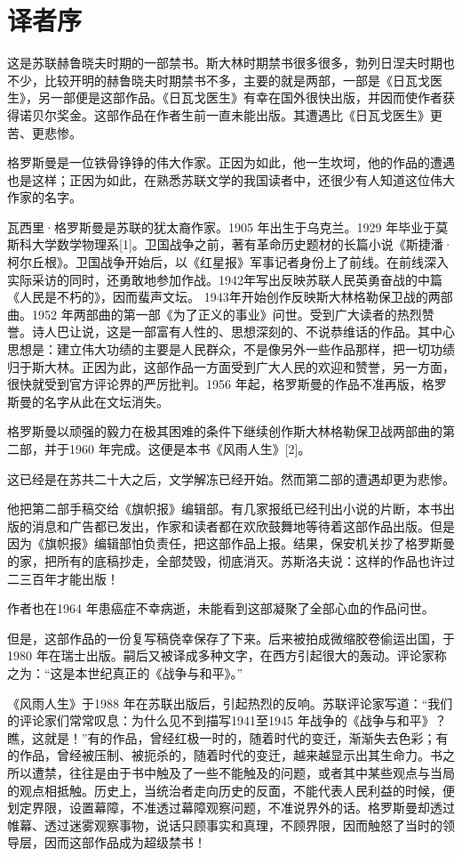 \section{ 译者序}


这是苏联赫鲁晓夫时期的一部禁书。斯大林时期禁书很多很多，勃列日涅夫时期也不少，比较开明的赫鲁晓夫时期禁书不多，主要的就是两部，一部是《日瓦戈医生》，另一部便是这部作品。《日瓦戈医生》有幸在国外很快出版，并因而使作者获得诺贝尔奖金。这部作品在作者生前一直未能出版。其遭遇比《日瓦戈医生》更苦、更悲惨。

格罗斯曼是一位铁骨铮铮的伟大作家。正因为如此，他一生坎坷，他的作品的遭遇也是这样；正因为如此，在熟悉苏联文学的我国读者中，还很少有人知道这位伟大作家的名字。

瓦西里·格罗斯曼是苏联的犹太裔作家。1905 年出生于乌克兰。1929 年毕业于莫斯科大学数学物理系[1]。卫国战争之前，著有革命历史题材的长篇小说《斯捷潘·柯尔丘根》。卫国战争开始后，以《红星报》军事记者身份上了前线。在前线深入实际采访的同时，还勇敢地参加作战。1942年写出反映苏联人民英勇奋战的中篇《人民是不朽的》，因而蜚声文坛。 1943年开始创作反映斯大林格勒保卫战的两部曲。1952 年两部曲的第一部《为了正义的事业》问世。受到广大读者的热烈赞誉。诗人巴让说，这是一部富有人性的、思想深刻的、不说恭维话的作品。其中心思想是：建立伟大功绩的主要是人民群众，不是像另外一些作品那样，把一切功绩归于斯大林。正因为此，这部作品一方面受到广大人民的欢迎和赞誉，另一方面，很快就受到官方评论界的严厉批判。1956 年起，格罗斯曼的作品不准再版，格罗斯曼的名字从此在文坛消失。

格罗斯曼以顽强的毅力在极其困难的条件下继续创作斯大林格勒保卫战两部曲的第二部，并于1960 年完成。这便是本书《风雨人生》[2]。

这已经是在苏共二十大之后，文学解冻已经开始。然而第二部的遭遇却更为悲惨。

他把第二部手稿交给《旗帜报》编辑部。有几家报纸已经刊出小说的片断，本书出版的消息和广告都已发出，作家和读者都在欢欣鼓舞地等待着这部作品出版。但是因为《旗帜报》编辑部怕负责任，把这部作品上报。结果，保安机关抄了格罗斯曼的家，把所有的底稿抄走，全部焚毁，彻底消灭。苏斯洛夫说：这样的作品也许过二三百年才能出版！

作者也在1964 年患癌症不幸病逝，未能看到这部凝聚了全部心血的作品问世。

但是，这部作品的一份复写稿侥幸保存了下来。后来被拍成微缩胶卷偷运出国，于1980 年在瑞士出版。嗣后又被译成多种文字，在西方引起很大的轰动。评论家称之为：“这是本世纪真正的《战争与和平》。”

《风雨人生》于1988 年在苏联出版后，引起热烈的反响。苏联评论家写道：“我们的评论家们常常叹息：为什么见不到描写1941至1945 年战争的《战争与和平》？瞧，这就是！”有的作品，曾经红极一时的，随着时代的变迁，渐渐失去色彩；有的作品，曾经被压制、被扼杀的，随着时代的变迁，越来越显示出其生命力。书之所以遭禁，往往是由于书中触及了一些不能触及的问题，或者其中某些观点与当局的观点相抵触。历史上，当统治者走向历史的反面，不能代表人民利益的时候，便划定界限，设置幕障，不准透过幕障观察问题，不准说界外的话。格罗斯曼却透过帷幕、透过迷雾观察事物，说话只顾事实和真理，不顾界限，因而触怒了当时的领导层，因而这部作品成为超级禁书！

